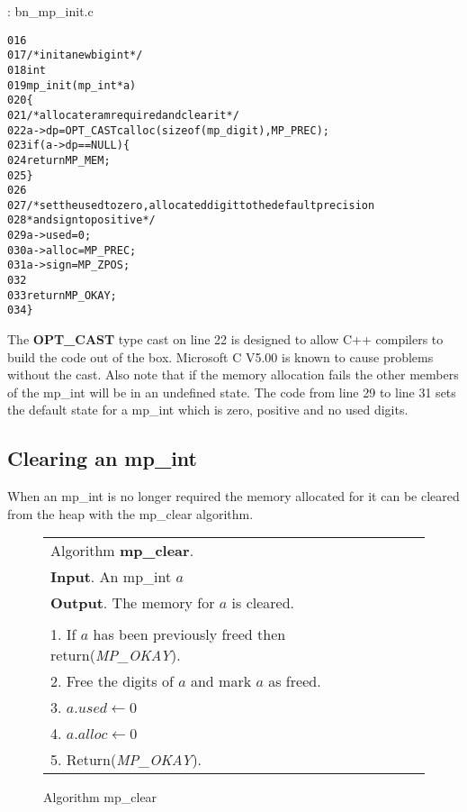 \documentclass[b5paper]{book}
\begin{document}
\vspace{+3mm}\begin{small}
\hspace{-5.1mm}{\bf File}: bn\_mp\_init.c
\vspace{-3mm}
\begin{alltt}
016   
017   /* init a new bigint */
018   int
019   mp_init (mp_int * a)
020   \{
021     /* allocate ram required and clear it */
022     a->dp = OPT_CAST calloc (sizeof (mp_digit), MP_PREC);
023     if (a->dp == NULL) \{
024       return MP_MEM;
025     \}
026   
027     /* set the used to zero, allocated digit to the default precision
028      * and sign to positive */
029     a->used  = 0;
030     a->alloc = MP_PREC;
031     a->sign  = MP_ZPOS;
032   
033     return MP_OKAY;
034   \}
\end{alltt}
\end{small}

The \textbf{OPT\_CAST} type cast on line 22 is designed to allow C++ compilers to build the code out of
the box.  Microsoft C V5.00 is known to cause problems without the cast.  Also note that if the memory
allocation fails the other members of the mp\_int will be in an undefined state.  The code from 
line 29 to line 31 sets the default state for a mp\_int which is zero, positive and no used digits.

\subsection{Clearing an mp\_int}
When an mp\_int is no longer required the memory allocated for it can be cleared from the heap with 
the mp\_clear algorithm.

\begin{figure}[here]
\begin{center}
\begin{tabular}{l}
\hline Algorithm \textbf{mp\_clear}. \\
\textbf{Input}.   An mp\_int $a$ \\
\textbf{Output}.  The memory for $a$ is cleared. \\
\hline \\
1.  If $a$ has been previously freed then return(\textit{MP\_OKAY}). \\
2.  Free the digits of $a$ and mark $a$ as freed. \\
3.  $a.used \leftarrow 0$ \\
4.  $a.alloc \leftarrow 0$ \\
5.  Return(\textit{MP\_OKAY}). \\
\hline
\end{tabular}
\end{center}
\caption{Algorithm mp\_clear}
\end{figure}
\end{document}
